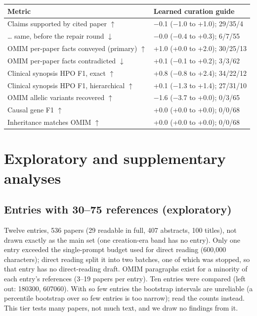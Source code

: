 \documentclass{article} %
\begin{document}
\begin{table}[!htbp]
\begin{tabularx}{\linewidth}{>{\raggedright\arraybackslash}p{4.0cm}>{\centering\arraybackslash}X}
\toprule
Metric & Learned curation guide \\
\midrule
Claims supported by cited paper $\uparrow$ & $-$0.1 ($-$1.0 to +1.0); 29/35/4 \\
\ldots{} same, before the repair round $\downarrow$ & $-$0.0 ($-$0.4 to +0.3); 6/7/55 \\
OMIM per-paper facts conveyed (primary) $\uparrow$ & +1.0 (+0.0 to +2.0); 30/25/13 \\
OMIM per-paper facts contradicted $\downarrow$ & +0.1 ($-$0.1 to +0.2); 3/3/62 \\
Clinical synopsis HPO F1, exact $\uparrow$ & +0.8 ($-$0.8 to +2.4); 34/22/12 \\
Clinical synopsis HPO F1, hierarchical $\uparrow$ & +0.1 ($-$1.3 to +1.4); 27/31/10 \\
OMIM allelic variants recovered $\uparrow$ & $-$1.6 ($-$3.7 to +0.0); 0/3/65 \\
Causal gene F1 $\uparrow$ & +0.0 (+0.0 to +0.0); 0/0/68 \\
Inheritance matches OMIM $\uparrow$ & +0.0 (+0.0 to +0.0); 0/0/68 \\
\bottomrule
\end{tabularx}
\end{table}

\FloatBarrier
\section{Exploratory and supplementary analyses}
\FloatBarrier
\subsection{Entries with 30--75 references (exploratory)}
\label{app:large}
Twelve entries, 536 papers (29 readable in full, 407 abstracts, 100 titles), not drawn exactly as the main set (one creation-era band has no entry). Only one entry exceeded the single-prompt budget used for direct reading (600,000 characters); direct reading split it into two batches, one of which was stopped, so that entry has no direct-reading draft. OMIM paragraphs exist for a minority of each entry's references (3--19 papers per entry). Ten entries were compared (left out: 180300, 607060). With so few entries the bootstrap intervals are unreliable (a percentile bootstrap over so few entries is too narrow); read the counts instead. This tier tests many papers, not much text, and we draw no findings from it.
\end{document}
